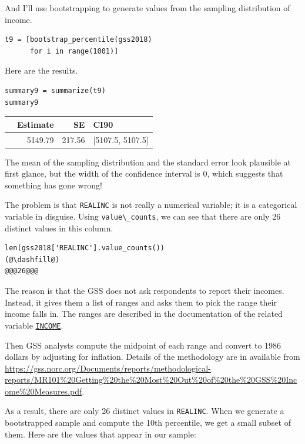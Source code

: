 And I'll use bootstrapping to generate values from the sampling
distribution of income.

\begin{lstlisting}[]
t9 = [bootstrap_percentile(gss2018)
      for i in range(1001)]
\end{lstlisting}

Here are the results.

\begin{lstlisting}[]
summary9 = summarize(t9)
summary9
\end{lstlisting}

\begin{tabular}{lrrl}
\midrule
{} &  Estimate &      SE &              CI90 \\
\midrule
{} &   5149.79 &  217.56 &  [5107.5, 5107.5] \\
\midrule
\end{tabular}

The mean of the sampling distribution and the standard error look
plausible at first glance, but the width of the confidence interval is
0, which suggests that something has gone wrong!

The problem is that \passthrough{\lstinline!REALINC!} is not really a
numerical variable; it is a categorical variable in disguise. Using
\passthrough{\lstinline!value\_counts!}, we can see that there are only
26 distinct values in this column.

\begin{lstlisting}[]
len(gss2018['REALINC'].value_counts())
(@\dashfill@)
@@@26@@@
\end{lstlisting}

The reason is that the GSS does not ask respondents to report their
incomes. Instead, it gives them a list of ranges and asks them to pick
the range their income falls in. The ranges are described in the
documentation of the related variable
\href{https://gssdataexplorer.norc.org/variables/104/vshow}{\passthrough{\lstinline!INCOME!}}.

Then GSS analysts compute the midpoint of each range and convert to 1986
dollars by adjusting for inflation. Details of the methodology are in
available from
\url{https://gss.norc.org/Documents/reports/methodological-reports/MR101\%20Getting\%20the\%20Most\%20Out\%20of\%20the\%20GSS\%20Income\%20Measures.pdf}.

As a result, there are only 26 distinct values in
\passthrough{\lstinline!REALINC!}. When we generate a bootstrapped
sample and compute the 10th percentile, we get a small subset of them.
Here are the values that appear in our sample:

